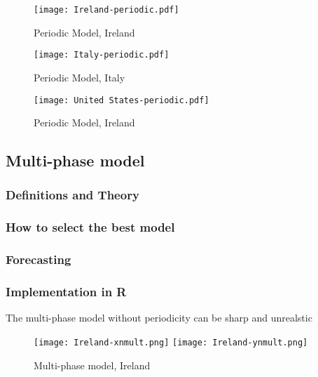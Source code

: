 \begin{figure}[H]
  \texttt{[image: Ireland-periodic.pdf]} \label{fig:usa-periodic}
\endminipage
\caption{Periodic Model, Ireland}
\end{figure}

\begin{figure}[H]
  \texttt{[image: Italy-periodic.pdf]} \label{fig:italy-periodic}
\endminipage 
\caption{Periodic Model, Italy}
\end{figure}

\begin{figure}[H]
  \texttt{[image: United States-periodic.pdf]} \label{fig:usa-periodic}
\endminipage
\caption{Periodic Model, Ireland}
\end{figure}

\subsection{Multi-phase model}

\subsubsection{Definitions and Theory}

\subsubsection{How to select the best model}

\subsubsection{Forecasting}

\subsubsection{Implementation in R}

The multi-phase model without periodicity can be sharp and unrealstic

\begin{figure}[H]
  \texttt{[image: Ireland-xnmult.png]} \label{fig:ireland-xnmult}
\endminipage\hfill
{}
  \texttt{[image: Ireland-ynmult.png]} \label{fig:ireland-ynmult}
\endminipage
\caption{Multi-phase model, Ireland}
\end{figure}

